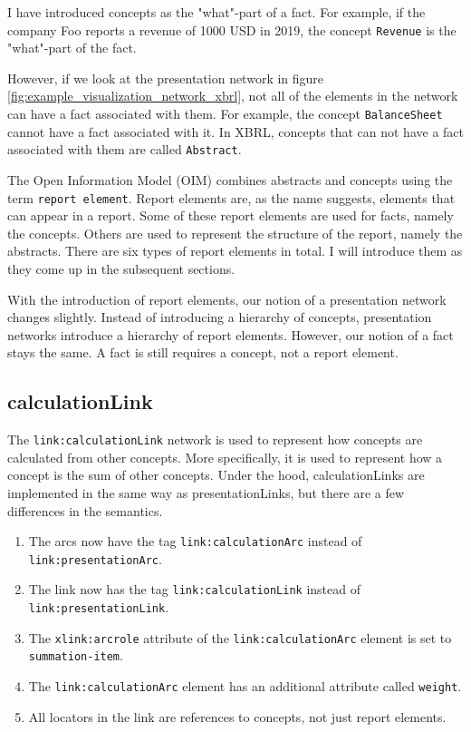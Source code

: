 I have introduced concepts as the "what"-part of a fact. 
For example, if the company Foo reports a revenue of 1000 USD in 2019, the concept \texttt{Revenue} is the "what"-part of the fact.

However, if we look at the presentation network in figure \ref{fig:example_visualization_network_xbrl}, not all of the elements in the network can have a fact associated with them.
For example, the concept \texttt{BalanceSheet} cannot have a fact associated with it.
In XBRL, concepts that can not have a fact associated with them are called \texttt{Abstract}.

The Open Information Model (OIM) combines abstracts and concepts using the term \texttt{report element}.
Report elements are, as the name suggests, elements that can appear in a report.
Some of these report elements are used for facts, namely the concepts.
Others are used to represent the structure of the report, namely the abstracts.
There are six types of report elements in total\cite{oim}. 
I will introduce them as they come up in the subsequent sections.

With the introduction of report elements, our notion of a presentation network changes slightly.
Instead of introducing a hierarchy of concepts, presentation networks introduce a hierarchy of report elements.
However, our notion of a fact stays the same.
A fact is still requires a concept, not a report element.

\subsection{calculationLink}

The \texttt{link:calculationLink} network is used to represent how concepts are calculated from other concepts.
More specifically, it is used to represent how a concept is the sum of other concepts.
Under the hood, calculationLinks are implemented in the same way as presentationLinks, but there are a few differences in the semantics.

\begin{enumerate}
    \item The arcs now have the tag \texttt{link:calculationArc} instead of \texttt{link:presentationArc}.
    \item The link now has the tag \texttt{link:calculationLink} instead of \texttt{link:presentationLink}.
    \item The \texttt{xlink:arcrole} attribute of the \texttt{link:calculationArc} element is set to \texttt{summation-item}.
    \item The \texttt{link:calculationArc} element has an additional attribute called \texttt{weight}.
    \item All locators in the link are references to concepts, not just report elements.
\end{enumerate}


